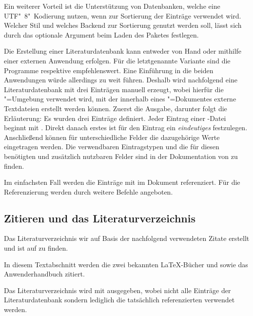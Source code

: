 \documentclass[%
  english,ngerman,%
  geometry=no,DIV=12,automark,%
]{tudscrartcl}
\begin{document}
Ein weiterer Vorteil ist die Unterstützung von Datenbanken, welche eine 
UTF"~8"~Kodierung nutzen, wenn  zur Sortierung der Einträge 
verwendet wird. Welcher Stil und welches Backend zur Sortierung genutzt werden 
soll, lässt sich durch das optionale Argument beim Laden des Paketes festlegen.
%
\begin{Hint*}
\usepackage[backend=biber,style=alphabetic]{biblatex}
\end{Hint*}
%
Die Erstellung einer Literaturdatenbank kann entweder von Hand oder mithilfe 
einer externen Anwendung erfolgen. Für die letztgenannte Variante sind die 
Programme  respektive  empfehlenswert. 
Eine Einführung in die beiden Anwendungen würde allerdings zu weit führen. 
Deshalb wird nachfolgend eine Literaturdatenbank mit drei Einträgen manuell 
erzeugt, wobei hierfür die "=Umgebung verwendet 
wird, mit der innerhalb eines "=Dokumentes externe Textdateien 
erstellt werden können. Zuerst die Ausgabe, darunter folgt die Erläuterung:
%
Es wurden drei Einträge definiert. Jeder Eintrag einer -Datei 
beginnt mit . Direkt danach erstes ist für den 
Eintrag ein \emph{eindeutiges}  festzulegen. Anschließend 
können für unterschiedliche Felder die dazugehörige Werte eingetragen werden. 
Die verwendbaren Eintragstypen und die für diesen benötigten und zusätzlich 
nutzbaren Felder sind in der Dokumentation von  zu finden.

Im einfachsten Fall werden die Einträge mit  im 
Dokument referenziert. Für die Referenzierung werden durch  
weitere Befehle angeboten.
%
\begin{Excerpt*}
\section{Zitieren und das Literaturverzeichnis}
Das Literaturverzeichnis wir auf Basis der nachfolgend verwendeten
Zitate erstellt und ist auf \pageref{sec:bibliography} zu finden.
\end{Excerpt*}
\begin{Excerpt}
In diesem Textabschnitt werden die zwei bekannten \LaTeX-Bücher
\cite{knuth84} und \cite{goossens94} sowie das Anwenderhandbuch
\cite{hanisch14} zitiert.
\end{Excerpt}
%
Das Literaturverzeichnis wird mit  ausgegeben, wobei 
nicht alle Einträge der Literaturdatenbank sondern lediglich die tatsächlich 
referenzierten verwendet werden.
%
\begin{Hint*}
\printbibliography
\end{Hint*}
\begin{quoting}[rightmargin=0pt]
\vspace*{-\baselineskip}
\InputExcerpt
\end{quoting}
\end{document}
